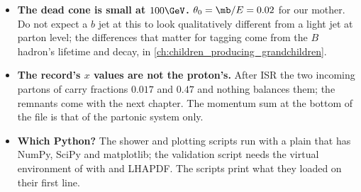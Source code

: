 \begin{pitfalls}
\begin{itemize}[nosep]
    count.
  \item \textbf{The dead cone is small at $100\GeV$.} $\theta_0=\mb/E=0.02$
    for our mother. Do not expect a $b$ jet at this \pt to look
    qualitatively different from a light jet at parton level; the
    differences that matter for tagging come from the $B$ hadron's
    lifetime and decay, in \cref{ch:children_producing_grandchildren}.
  \item \textbf{The record's $x$ values are not the proton's.} After ISR
    the two incoming partons of  carry fractions
    $0.017$ and $0.47$ and nothing balances them; the remnants come with the
    next chapter. The momentum sum at the bottom of the file is that of the
    partonic system only.
  \item \textbf{Which Python?} The shower and plotting scripts run with a
    plain  that has NumPy, SciPy and matplotlib; the
    validation script needs the virtual environment of
     with  and LHAPDF. The
    scripts print what they loaded on their first line.
\end{itemize}
\end{pitfalls}

